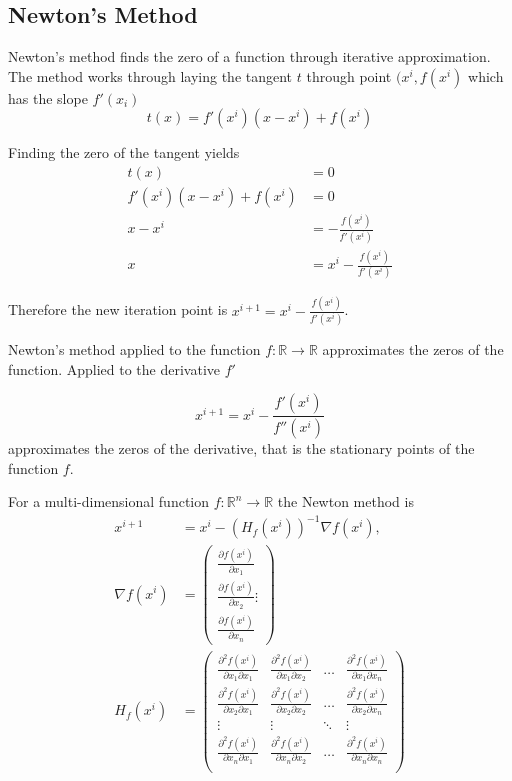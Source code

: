 \documentclass[11pt]{article}
\begin{document}
\subsection{Newton's Method}

Newton's method finds the zero of a function through iterative approximation. The method works through laying the tangent $t$ through point $(x^i, f(x^i)$ which has the slope $f'(x_i)$
\begin{equation*}
	t(x) = f'(x^i)(x-x^i) + f(x^i)
\end{equation*}

\noindent
Finding the zero of the tangent yields
\begin{align*}
	t(x) &= 0\\
	f'(x^i)(x-x^i) + f(x^i) &= 0\\
	x - x^i &= - \frac{f(x^i)}{f'(x^i)}\\
	x &= x^i - \frac{f(x^i)}{f'(x^i)}
\end{align*}

\noindent
Therefore the new iteration point is $x^{i+1} = x^i - \frac{f(x^i)}{f'(x^i)}$.

Newton's method applied to the function $f: \mathbb{R} \rightarrow \mathbb{R}$ approximates the zeros of the function. Applied to the derivative $f'$

\begin{equation*}
	x^{i+1} = x^i - \frac{f'(x^i)}{f''(x^i)}
\end{equation*}
\noindent
approximates the zeros of the derivative, that is the stationary points of the function $f$.

For a multi-dimensional function $f: \mathbb{R}^n \rightarrow \mathbb{R}$ the Newton method is
\begin{align*}
	x^{i+1} &= x^i -(H_f(x^i))^{-1} \nabla f(x^i)\text{,}\\
	\nabla f(x^i) &= \begin{pmatrix}
		\frac{\partial f(x^i)}{\partial x_1}\\
		\frac{\partial f(x^i)}{\partial x_2}
		\vdots\\
		\frac{\partial f(x^i)}{\partial x_n}
	\end{pmatrix}\\
	H_f(x^i) &= \begin{pmatrix}
	\frac{\partial^2 f(x^i)}{\partial x_1\partial x_1} & \frac{\partial^2 f(x^i)}{\partial x_1\partial x_2} & \dots & \frac{\partial^2 f(x^i)}{\partial x_1\partial x_n}\\
	\frac{\partial^2 f(x^i)}{\partial x_2\partial x_1} & \frac{\partial^2 f(x^i)}{\partial x_2\partial x_2} & \dots & \frac{\partial^2 f(x^i)}{\partial x_2\partial x_n}\\
	\vdots & \vdots & \ddots & \vdots\\
	\frac{\partial^2 f(x^i)}{\partial x_n\partial x_1} & \frac{\partial^2 f(x^i)}{\partial x_n\partial x_2} & \dots & \frac{\partial^2 f(x^i)}{\partial x_n\partial x_n}\\
	\end{pmatrix}
\end{align*}
\end{document}
